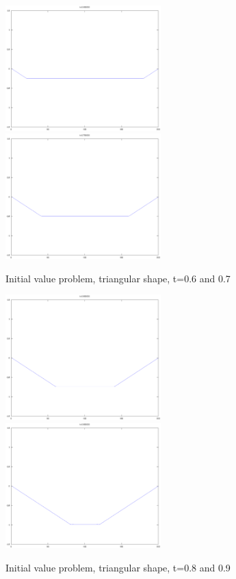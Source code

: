 \documentclass[a4paper,10pt]{report}
\begin{document}
\begin{figure}
 \includegraphics[width=6cm]{./fixed_ends_analytic_t0.600000.eps}
\includegraphics[width=6cm]{./fixed_ends_analytic_t0.700000.eps}

\caption{Initial value problem, triangular shape, t=0.6 and 0.7}
\end{figure} 

\begin{figure}
 \includegraphics[width=6cm]{./fixed_ends_analytic_t0.800000.eps}
\includegraphics[width=6cm]{./fixed_ends_analytic_t0.900000.eps}

\caption{Initial value problem, triangular shape, t=0.8 and 0.9}
\end{figure} 
\end{document}
